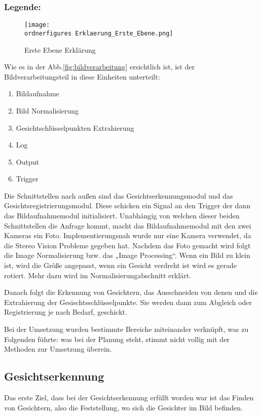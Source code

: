\subsubsection{Legende:}
\begin{figure}[H]
	\texttt{[image: \\ordnerfigures Erklaerung\_Erste\_Ebene.png]}
	\caption{Erste Ebene Erklärung}
	\label{fig:Erklaerung_Erste_Ebene}
\end{figure}

Wie es in der Abb.\ref{fig:bildverarbeitung} ersichtlich ist, ist der
Bildverarbeitungsteil in diese Einheiten unterteilt:
\begin{enumerate}
	\item Bildaufnahme
	\item Bild Normalisierung
	\item Gesichtschlüsselpunkten Extrahierung
	\item Log
	\item Output 
	\item Trigger 
\end{enumerate}


	Die Schnittstellen nach außen sind das Gesichtserkennungsmodul und das
	Gesichtsregistrierungsmodul.  
	Diese schicken ein Signal an den Trigger der dann das Bildaufnahmemodul
	initialisiert. Unabhängig von welchen dieser beiden Schnittstellen die Anfrage
	kommt, macht das Bildaufnahmemodul mit den zwei Kameras ein Foto. 
	\justify
	Implementierungsnah wurde nur eine Kamera verwendet, da die Stereo Vision
	Probleme gegeben hat. 
	Nachdem das Foto gemacht wird folgt die Image Normalisierung bzw. das „Image
	Processing“. 
	Wenn ein Bild zu klein ist, wird die Größe angepasst, wenn ein Gesicht verdreht
	ist wird es gerade rotiert. Mehr dazu wird im Normalisierungabschnitt erklärt.
	
	Danach folgt die Erkennung von Gesichtern, das Ausschneiden von denen und die
	Extrahierung der Gesischtsschlüsselpunkte. 
	Sie werden dann zum Abgleich oder Registrierung je nach Bedarf, geschickt.
	
	Bei der Umsetzung wurden bestimmte Bereiche miteinander verknüpft, was zu
	Folgenden führte: was bei der Planung steht, stimmt nicht vollig mit der
	Methoden zur Umsetzung überein.


\subsection{Gesichtserkennung}

	Das erste Ziel, dass bei der Gesichtserkennung erfüllt worden war ist das Finden
	von Gesichtern, also die Feststellung, wo sich die Gesichter im Bild befinden.
	 
